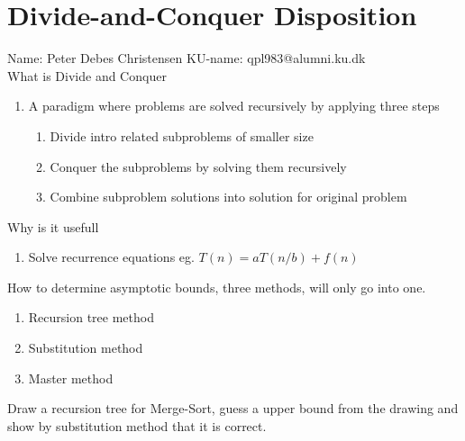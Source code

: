 \documentclass{report}
\begin{document}
\section*{Divide-and-Conquer Disposition}
Name: Peter Debes Christensen\hfill
KU-name: qpl983@alumni.ku.dk \\[\baselineskip]
%
What is Divide and Conquer
\begin{enumerate}
	\item A paradigm where problems are solved recursively by applying three steps
	\begin{enumerate}
		\item Divide intro related subproblems of smaller size
		\item Conquer the subproblems by solving them recursively
		\item Combine subproblem solutions into solution for original problem
	\end{enumerate}
\end{enumerate}
Why is it usefull
\begin{enumerate}
	\item Solve recurrence equations eg. $T(n) = aT(n/b) + f(n)$
\end{enumerate}
How to determine asymptotic bounds, three methods, will only go into one.
\begin{enumerate}
	\item Recursion tree method
	\item Substitution method
	\item Master method
\end{enumerate}
Draw a recursion tree for Merge-Sort, guess a upper bound from the drawing and show by substitution method that it is correct.
\end{document}
